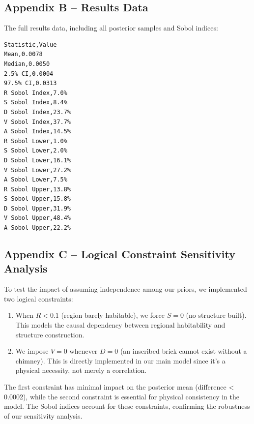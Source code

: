 \documentclass[
  11pt,
]{article}
\begin{document}
\subsection{Appendix B -- Results Data}\label{appendix-b-results-data}

The full results data, including all posterior samples and Sobol
indices:

\begin{verbatim}
Statistic,Value
Mean,0.0078
Median,0.0050
2.5% CI,0.0004
97.5% CI,0.0313
R Sobol Index,7.0%
S Sobol Index,8.4% 
D Sobol Index,23.7%
V Sobol Index,37.7%
A Sobol Index,14.5%
R Sobol Lower,1.0%
S Sobol Lower,2.0%
D Sobol Lower,16.1%
V Sobol Lower,27.2%
A Sobol Lower,7.5%
R Sobol Upper,13.8%
S Sobol Upper,15.8%
D Sobol Upper,31.9%
V Sobol Upper,48.4%
A Sobol Upper,22.2%
\end{verbatim}

\subsection{Appendix C -- Logical Constraint Sensitivity
Analysis}\label{appendix-c-logical-constraint-sensitivity-analysis}

To test the impact of assuming independence among our priors, we
implemented two logical constraints:

\begin{enumerate}
\def\labelenumi{\arabic{enumi}.}
\item
  When \(R < 0.1\) (region barely habitable), we force \(S = 0\) (no
  structure built). This models the causal dependency between regional
  habitability and structure construction.
\item
  We impose \(V = 0\) whenever \(D = 0\) (an inscribed brick cannot
  exist without a chimney). This is directly implemented in our main
  model since it's a physical necessity, not merely a correlation.
\end{enumerate}

The first constraint has minimal impact on the posterior mean
(difference \textless{} 0.0002), while the second constraint is
essential for physical consistency in the model. The Sobol indices
account for these constraints, confirming the robustness of our
sensitivity analysis.
\end{document}
